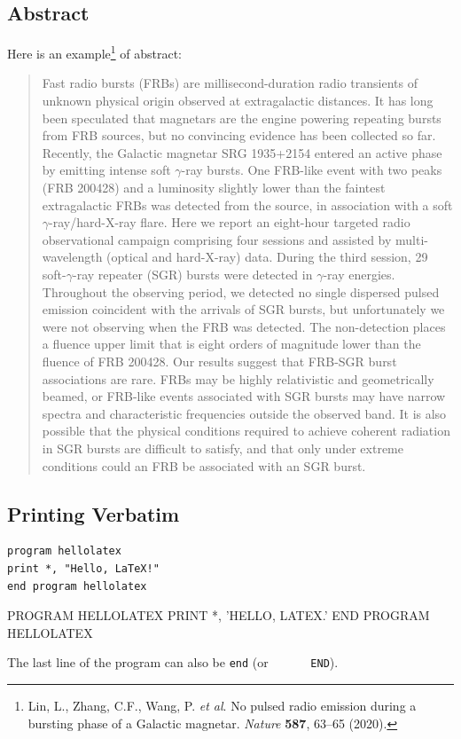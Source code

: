 \documentclass[a4paper,10pt]{article}
\begin{document}
    \subsection{Abstract}
    Here is an example\footnote{
        Lin, L., Zhang, C.F., Wang, P. \textit{et al}.
        No pulsed radio emission during a bursting phase of a Galactic magnetar.
        \textit{Nature} \textbf{587}, 63--65 (2020).} of abstract:
    \begin{abstract}
        Fast radio bursts (FRBs) are millisecond-duration radio transients of
        unknown physical origin observed at extragalactic distances. It has
        long been speculated that magnetars are the engine powering repeating
        bursts from FRB sources, but no convincing evidence has been collected
        so far. Recently, the Galactic magnetar SRG 1935+2154 entered an active
        phase by emitting intense soft $\gamma$-ray bursts. One FRB-like event
        with two peaks (FRB 200428) and a luminosity slightly lower than the
        faintest extragalactic FRBs was detected from the source, in
        association with a soft $\gamma$-ray/hard-X-ray flare. Here we report
        an eight-hour targeted radio observational campaign comprising four
        sessions and assisted by multi-wavelength (optical and hard-X-ray)
        data. During the third session, 29 soft-$\gamma$-ray repeater (SGR)
        bursts were detected in $\gamma$-ray energies. Throughout the observing
        period, we detected no single dispersed pulsed emission coincident with
        the arrivals of SGR bursts, but unfortunately we were not observing
        when the FRB was detected. The non-detection places a fluence upper
        limit that is eight orders of magnitude lower than the fluence of FRB
        200428. Our results suggest that FRB-SGR burst associations are rare.
        FRBs may be highly relativistic and geometrically beamed, or FRB-like
        events associated with SGR bursts may have narrow spectra and
        characteristic frequencies outside the observed band. It is also
        possible that the physical conditions required to achieve coherent
        radiation in SGR bursts are difficult to satisfy, and that only under
        extreme conditions could an FRB be associated with an SGR burst.
    \end{abstract}
    \newpage
    \subsection{Printing Verbatim}
\begin{verbatim}
program hellolatex
print *, "Hello, LaTeX!"
end program hellolatex
\end{verbatim}
\begin{verbatim*}
      PROGRAM HELLOLATEX
      PRINT *, 'HELLO, LATEX.'
      END PROGRAM HELLOLATEX
\end{verbatim*}
    The last line of the program can also be \verb|end| (or \verb*|      END|).
\end{document}
